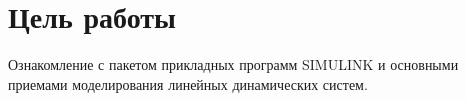 \documentclass[a4paper,12pt,russian]{article} %
\begin{document}
		

	\renewcommand\titleBotRIGHT{
	\spboxmm{100}{70}{70}{30}{lc}{\parbox{70mm}{
			\normalsize{Преподаватель: Чепинский С.А. }\\ 
			\normalsize{Студенты: Французов Р.А.\\  Донцова М.А.}\\
			\normalsize{Группа: R3325}\\
			\normalsize{Вариант: 18}}}}

		\maketitle
		
		\section{Цель работы}
		Ознакомление с пакетом прикладных программ SIMULINK и основными приемами моделирования линейных динамических систем. \\
		
\end{document}
